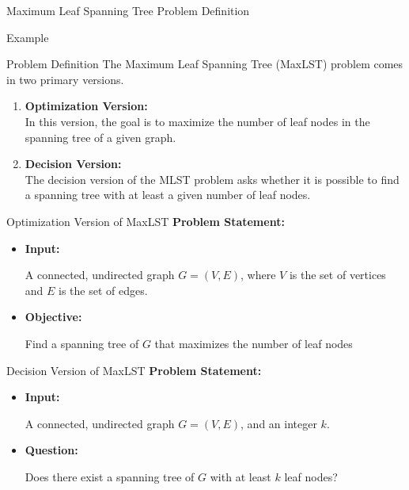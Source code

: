 \documentclass[xcolor=svgnames]{beamer}
\begin{document}
\begin{section}{Maximum Leaf Spanning Tree Problem Definition}
\begin{frame}{Example}
\begin{minipage}
        \end{minipage}
        \vspace{15pt}
    \end{frame}
    \begin{frame}{Problem Definition}
        The Maximum Leaf Spanning Tree (MaxLST) problem comes in two primary versions.
        \begin{enumerate}
            \item<2-> \textbf{Optimization Version:} \\In this version, the goal is to maximize the number of leaf nodes in the spanning tree of a given graph.
            \item<3-> \textbf{Decision Version:}\\The decision version of the MLST problem asks whether it is possible to find a spanning tree with at least a given number of leaf nodes.
        \end{enumerate}
    \end{frame}
    \begin{frame}{Optimization Version of MaxLST}
        \textbf{Problem Statement:}
        \begin{itemize}[<+->]
            \item \textbf{Input:} \par A connected, undirected graph $ G=(V,E) $, where $V$ is the set of vertices and $E$ is the set of edges.
            \item \textbf{Objective:} \par Find a spanning tree of $G$ that maximizes the number of leaf nodes 
        \end{itemize}
    \end{frame}
    \begin{frame}{Decision Version of MaxLST}
        \textbf{Problem Statement:}
        \begin{itemize}[<+->]
            \item \textbf{Input:} \par A connected, undirected graph $ G=(V,E) $, and an integer $k$.
            \item \textbf{Question:} \par Does there exist a spanning tree of $G$ with at least $k$ leaf nodes? 
        \end{itemize}
    \end{frame}
\end{section}
\end{document}
